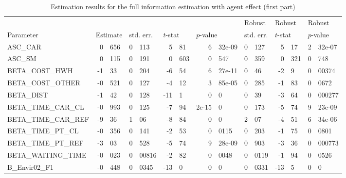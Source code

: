 \documentclass[12pt,a4paper]{article}
\begin{document}
 \begin{sidewaystable}[htb]
\caption{\label{tab:fi-sc}Estimation results for the full information
  estimation with agent effect (first part)}
\begin{tabular}{lr@{.}lr@{.}lr@{.}lr@{.}lr@{.}lr@{.}lr@{.}l}
                      &   \multicolumn{2}{l}{}    & \multicolumn{2}{l}{} & \multicolumn{2}{l}{}  &     \multicolumn{2}{l}{} &   \multicolumn{2}{l}{Robust}    & \multicolumn{2}{l}{Robust}  &     \multicolumn{2}{l}{Robust}   \\
Parameter      & \multicolumn{2}{l}{Estimate}  &
\multicolumn{2}{l}{std. err.}  &  \multicolumn{2}{l}{$t$-stat}  &   \multicolumn{2}{l}{$p$-value}  &
\multicolumn{2}{l}{std. err.}  &  \multicolumn{2}{l}{$t$-stat}  &   \multicolumn{2}{l}{$p$-value}   \\
\hline
ASC\_CAR                    &   0&656 &    0&113 &    5&81 & 6&32e-09 &         0&127 &         5&17 &      2&32e-07 \\
ASC\_SM                     &   0&115 &    0&191 &   0&603 &    0&547 &         0&359 &        0&321 &         0&748 \\
BETA\_COST\_HWH              &   -1&33 &    0&204 &   -6&54 & 6&27e-11 &          0&46 &         -2&9 &       0&00374 \\
BETA\_COST\_OTHER            &  -0&521 &    0&127 &   -4&12 & 3&85e-05 &         0&285 &        -1&83 &        0&0672 \\
BETA\_DIST                  &   -1&42 &    0&128 &   -11&1 &      0&0 &          0&39 &        -3&64 &      0&000277 \\
BETA\_TIME\_CAR\_CL           &  -0&993 &    0&125 &   -7&94 &  2e-15&0 &         0&173 &        -5&74 &      9&23e-09 \\
BETA\_TIME\_CAR\_REF          &   -9&36 &     1&06 &   -8&84 &      0&0 &          2&07 &        -4&51 &      6&34e-06 \\
BETA\_TIME\_PT\_CL            &  -0&356 &    0&141 &   -2&53 &   0&0115 &         0&203 &        -1&75 &        0&0801 \\
BETA\_TIME\_PT\_REF           &   -3&03 &    0&528 &   -5&74 & 9&28e-09 &         0&903 &        -3&36 &      0&000773 \\
BETA\_WAITING\_TIME          &  -0&023 &  0&00816 &   -2&82 &   0&0048 &        0&0119 &        -1&94 &        0&0526 \\
B\_Envir02\_F1               &  -0&448 &   0&0345 &   -13&0 &      0&0 &        0&0331 &        -13&5 &           0&0 \\

\end{tabular}
\end{sidewaystable}
\end{document}
